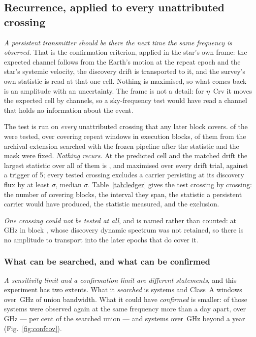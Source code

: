 \subsection{Recurrence, applied to every unattributed crossing}
\label{sec:etacrv}

\emph{A persistent transmitter should be there the next time the same
frequency is observed.} That is the confirmation criterion, applied in the
star's own frame: the expected channel follows from the Earth's motion at the
repeat epoch and the star's systemic velocity, the discovery drift is
transported to it, and the survey's own statistic is read at that one cell.
Nothing is maximised, so what comes back is an amplitude with an uncertainty.
The frame is not a detail: for $\eta$~Crv it moves the expected cell by
\VnEcrDchan{} channels, so a sky-frequency test would have read a channel
that holds no information about the event.

The test is run on \emph{every} unattributed crossing that any later block
covers. \RcNTested{} of the \NUnattributed{} were tested, over
\RcNRepeatMeas{} covering repeat windows in \RcNRepeatBlock{} execution
blocks, \RcNRepeatFollow{} of them from the archival extension searched with
the frozen pipeline after the statistic and the mask were fixed.
\emph{Nothing recurs.} At the predicted cell and the matched drift the
largest statistic over all of them is \RcTMatched, and \RcTMax{} maximised
over every drift trial, against a trigger of 5; every tested crossing
excludes a carrier persisting at its discovery flux by at least
\RcExclMin$\sigma$, median \RcExclMed$\sigma$. Table~\ref{tab:ledger} gives
the test crossing by crossing: the number of covering blocks, the interval
they span, the statistic a persistent carrier would have produced, the
statistic measured, and the exclusion.

\emph{One crossing could not be tested at all}, and is named rather than
counted: \RcUntStar{} at \RcUntFreq\,GHz in block \texttt{\RcUntEb}, whose
discovery dynamic spectrum was not retained, so there is no amplitude to
transport into the \RcUntNRep{} later epochs that do cover it.

\subsubsection{What can be searched, and what can be confirmed}
\label{sec:confirmability}

\emph{A sensitivity limit and a confirmation limit are different statements},
and this experiment has two extents. What it \emph{searched} is
\RcSearchSys{} systems and \RcSearchWin{} Class~A windows over
\CvUnionA\,GHz of union bandwidth. What it could have \emph{confirmed} is
smaller: \RcConfSysDay{} of those systems were observed again at the same
frequency more than a day apart, over \CvConfGHzDay\,GHz --- \CvConfPctDay{}
per cent of the searched union --- and \RcConfSysYr{} systems over
\CvConfGHzYr\,GHz beyond a year (Fig.~\ref{fig:confcov}).

